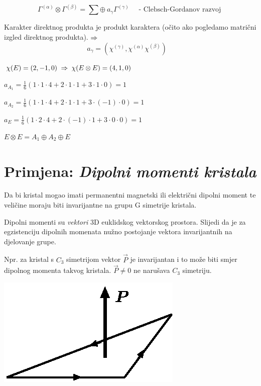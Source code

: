 \begin{displaymath}
  \Gamma^{(\alpha)}\otimes\Gamma^{(\beta)} =
  \sum \oplus\: a_{\gamma}\Gamma^{(\gamma)} \quad
   \textrm{ - Clebsch-Gordanov razvoj }
\end{displaymath}


Karakter direktnog produkta je produkt karaktera (očito ako pogledamo
matrični izgled direktnog produkta).$\;\Rightarrow\;$
\begin{displaymath}
a_{\gamma}  = (\chi^{(\gamma)}, \chi^{(\alpha)}\chi^{(\beta)}) \quad
\end{displaymath}

\begin{primjer}[$E\otimes E$ u $D_3$]
$\chi(E)=(2, -1, 0) \;\Rightarrow\; \chi(E\otimes E)=(4, 1, 0)$

$a_{A_1}=\frac{1}{6}(1\cdot 1\cdot 4+2\cdot 1\cdot 1+3\cdot 1\cdot 0)=1$

$a_{A_2}=\frac{1}{6}(1\cdot 1\cdot 4+2\cdot 1\cdot 1+3\cdot (-1)\cdot 0)=1$

$a_{E}=\frac{1}{6}(1\cdot 2\cdot 4+2\cdot (-1)\cdot 1+3\cdot 0\cdot 0)=1$

$E\otimes E = A_1 \oplus A_2 \oplus E $
\end{primjer}

\section{Primjena: \emph{Dipolni momenti kristala}}

Da bi kristal mogao imati permanentni magnetski ili električni dipolni
moment te veličine moraju biti invarijantne na grupu G simetrije
kristala.

Dipolni momenti su \emph{vektori} 3D euklidskog vektorskog prostora. Slijedi
da je za egzistenciju dipolnih momenata nužno postojanje vektora 
invarijantnih na djelovanje grupe.

Npr. za kristal s $C_3$ simetrijom vektor $\vec{P}$ je invarijantan i
to može biti smjer dipolnog  momenta takvog kristala. $\vec{P}\neq 0$
ne narušava $C_3$ simetriju.

\centerline{\includegraphics[scale=1.0]{pics/dipol.eps}}

